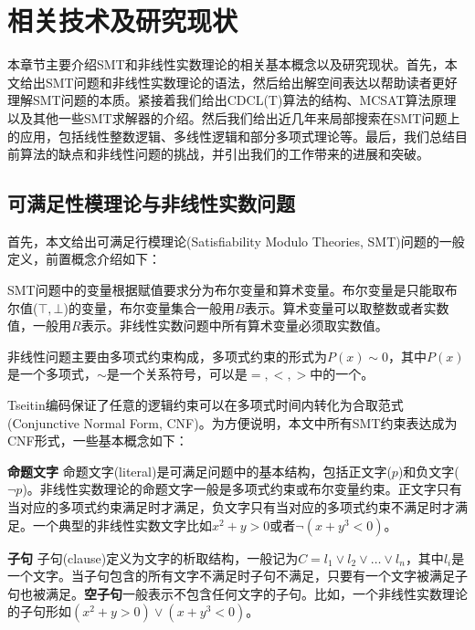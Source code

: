 \chapter{相关技术及研究现状}\label{chap:Relate}

本章节主要介绍SMT和非线性实数理论的相关基本概念以及研究现状。首先，本文给出SMT问题和非线性实数理论的语法，然后给出解空间表达以帮助读者更好理解SMT问题的本质。紧接着我们给出CDCL(T)算法的结构、MCSAT算法原理以及其他一些SMT求解器的介绍。然后我们给出近几年来局部搜索在SMT问题上的应用，包括线性整数逻辑、多线性逻辑和部分多项式理论等。最后，我们总结目前算法的缺点和非线性问题的挑战，并引出我们的工作带来的进展和突破。

\section{可满足性模理论与非线性实数问题}
首先，本文给出可满足行模理论(Satisfiability Modulo Theories, SMT)问题的一般定义，前置概念介绍如下：

\begin{definition}[\textbf{变量}]
SMT问题中的变量根据赋值要求分为布尔变量和算术变量。布尔变量是只能取布尔值($\top, \bot$)的变量，布尔变量集合一般用$B$表示。算术变量可以取整数或者实数值，一般用$R$表示。非线性实数问题中所有算术变量必须取实数值。
\end{definition}

\begin{definition}
非线性问题主要由多项式约束构成，多项式约束的形式为$P(x) \sim 0$，其中$P(x)$是一个多项式，$\sim$是一个关系符号，可以是$=, <, >$中的一个。
\end{definition}


Tseitin编码保证了任意的逻辑约束可以在多项式时间内转化为合取范式(Conjunctive Normal Form, CNF)。为方便说明，本文中所有SMT约束表达成为CNF形式，一些基本概念如下：
\begin{definition}{\textbf{命题文字}}
命题文字(literal)是可满足问题中的基本结构，包括正文字($p$)和负文字($\neg p$)。非线性实数理论的命题文字一般是多项式约束或布尔变量约束。正文字只有当对应的多项式约束满足时才满足，负文字只有当对应的多项式约束不满足时才满足。一个典型的非线性实数文字比如$x^2 + y > 0$或者$\neg (x + y^3 < 0)$。
\end{definition}

\begin{definition}{\textbf{子句}}
子句(clause)定义为文字的析取结构，一般记为$C = l_1 \vee l_2 \vee \dots \vee l_n$，其中$l_i$是一个文字。当子句包含的所有文字不满足时子句不满足，只要有一个文字被满足子句也被满足。\textbf{空子句}一般表示不包含任何文字的子句。比如，一个非线性实数理论的子句形如$(x^2 + y > 0) \vee (x + y^3 < 0)$。
\end{definition}

